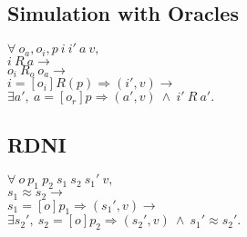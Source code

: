 \subsection{Simulation with Oracles}

$\forall\ o_a, o_i, p\ i\ i'\ a\ v,$\\
$i\ R\ a \rightarrow$\\
$o_i\ R_o\ o_a \rightarrow$\\
$i =[o_i] R(p)\Rightarrow (i', v) \rightarrow$\\
$\exists a',\ a =[o_r] p\Rightarrow (a', v)\ \wedge\ i'\ R\ a'.$\\

\subsection{RDNI}

$\forall\ o\ p_1\ p_2\ s_1\ s_2\ s_1'\ v,$\\
$s_1\approx s_2 \rightarrow$\\
$s_1 =[o]p_1\Rightarrow (s_1', v) \rightarrow$\\
$\exists s_2',\ s_2 =[o]p_2\Rightarrow (s_2', v)\ \wedge\ s_1'\approx s_2'.$\\